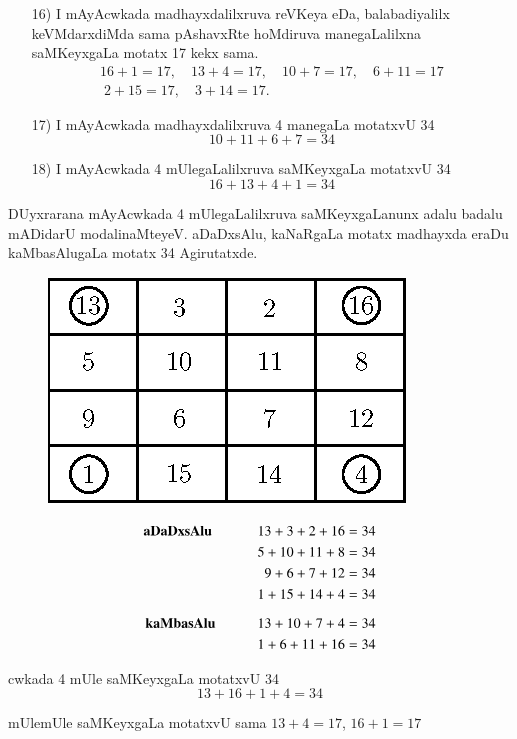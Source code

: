 \begin{enumerate}
\item[{\rm 16)}] I mAyAcwkada madhayxdalilxruva reVKeya eDa, balabadiyalilx keVMdarxdiMda sama pAshavxRte hoMdiruva manegaLalilxna saMKeyxgaLa motatx {\rm 17} kekx sama.
\begin{gather*}
16+1=17, \quad 13+4=17, \quad 10+7=17, \quad 6+11=17 \\
\;2+15=17, \quad 3+14=17.
\end{gather*}
 
\item[{\rm 17)}] I mAyAcwkada madhayxdalilxruva {\rm 4} manegaLa motatxvU {\rm 34}
$$
10+11+6+7=34
$$

\item[{\rm 18)}] I mAyAcwkada {\rm 4} mUlegaLalilxruva saMKeyxgaLa motatxvU {\rm 34}
$$
16+13+4+1=34
$$
\end{enumerate}

DUyxrarana mAyAcwkada {\rm 4} mUlegaLalilxruva saMKeyxgaLanunx adalu badalu mADidarU modalinaMteyeV. aDaDxsAlu, kaNaRgaLa motatx madhayxda eraDu kaMbasAlugaLa motatx {\rm 34} Agirutatxde.
\begin{figure}[H]
\centering
\includegraphics[scale=.8]{src/figures/m_123.eps}
\end{figure}

\begin{alignat*}{3}
\text{\bf aDaDxsAlu }\qquad  && 13+3+2+16&=34\\
&&5+10+11+8&=34\\
&&9+6+7+12&=34\\
&&1+15+14+4&=34\\[0.2cm]
\text{\bf kaMbasAlu} \qquad  &&13+10+7+4 &=34\\
&&1+6+11+16&=34
\end{alignat*}

cwkada {\rm 4} mUle saMKeyxgaLa motatxvU {\rm 34}
$$
13+16+1+4=34
$$

mUlemUle saMKeyxgaLa motatxvU sama $13+4=17$, \quad $16+1=17$


